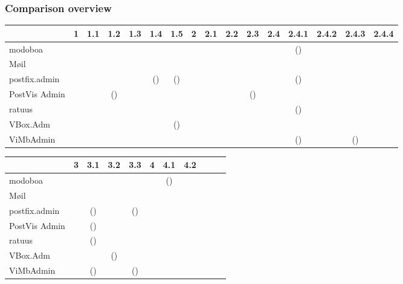 \documentclass[12pt,a4paper]{scrartcl}
\begin{document}

			\begin{landscape}
				\subsubsection*{Comparison overview}
				\label{sec:evaluation:overview}

					\begin{tabular}{l|cccccc|ccccccccc}
						              & 1 & 1.1 & 1.2  & 1.3 & 1.4   & 1.5  & 2 & 2.1 & 2.2 & 2.3  & 2.4 & 2.4.1 & 2.4.2 & 2.4.3 & 2.4.4 \\
						\hline
						modoboa       &   & \y  &  \n  & \y  &  \y   &  \y  &   & \y  & \y  &  \y  &     & (\y)  & \y    &  \y   & \y    \\
						Møil          &   & \y  &  \n  & \y  &  \y   &  \y  &   & \y  & \y  &  \y  &     &  \y   & \n    &  \n   & \n    \\
						postfix.admin &   & \n  &      &     & (\y)  & (\y) &   & \y  & \y  &  \y  &     & (\y)  & \y    &  \n   & \n    \\
						PostVis Admin &   & \n  & (\y) & \n  &  \n   &  \n  &   & \y  & \n  & (\y) &     &  \n   & \n    &  \n   & \y    \\
						ratuus        &   & \n  &  \y  & \y  &  \n   &  \n  &   & \y  & \y  &  \y  &     & (\y)  & \n    &  \n   & \n    \\
						VBox.Adm      &   & \y  &  \n  & \y  &  \n   & (\y) &   & \y  & \y  &  \y  &     &  \n   & \y    &  \n   & \y    \\
						ViMbAdmin     &   & \y  &  \n  & \n  &       &  \y  &   & \y  & \y  &  \y  &     & (\y)  & \n    & (\n)  & \n    \\
						\hline
					\end{tabular}
					\s

					\noindent
					\begin{tabular}{l|cccc|ccc|ccc}
						              & 3 & 3.1  & 3.2  & 3.3  & 4 & 4.1  & 4.2 \\
						\hline
						modoboa       &   &  \y  &  \y  &  \y  &   & (\y) & \y  \\
						Møil          &   &  \y  &  \y  &  \y  &   &  \y  & \y  \\
						postfix.admin &   & (\y) &  \n  & (\y) &   &  \n  & \y  \\
						PostVis Admin &   & (\y) &  \n  &  \n  &   &  \n  & \n  \\
						ratuus        &   & (\y) &  \n  &  \y  &   &  \n  & \n  \\
						VBox.Adm      &   &  \y  & (\y) &  \y  &   &  \n  & \y  \\
						ViMbAdmin     &   & (\y) &      & (\n) &   &      &     \\
						\hline
					\end{tabular}
					\s


\end{landscape}
\end{document}
